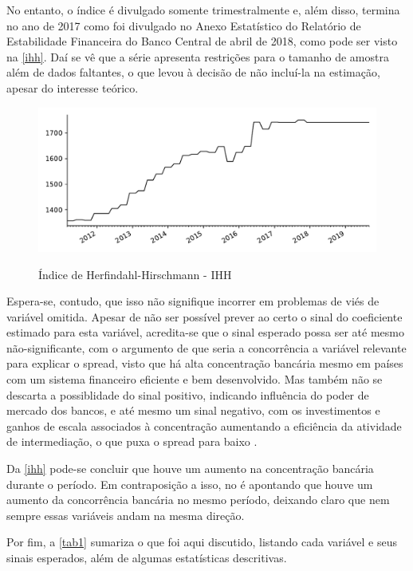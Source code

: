 \documentclass[a4paper,
               article,
               12pt,
               openany,
               oneside,
               english,
               brazil]{abntex2}
\numberwithin{equation}{section}
\begin{document}
    No entanto, o índice é divulgado somente trimestralmente e, além disso, termina no ano de 2017 como foi divulgado no Anexo Estatístico do Relatório de Estabilidade Financeira do Banco Central de abril de 2018, como pode ser visto na \autoref{ihh}. Daí se vê que a série apresenta restrições para o tamanho de amostra além de dados faltantes, o que levou à decisão de não incluí-la na estimação, apesar do interesse teórico.

    \begin{figure}[h]
        \centering
        \caption{Índice de Herfindahl-Hirschmann - IHH}
        \includegraphics[width = \textwidth, scale=0.75]{ihh.pdf}
        \label{ihh}
    \end{figure}

    Espera-se, contudo, que isso não signifique incorrer em problemas de viés de variável omitida. Apesar de não ser possível prever ao certo o sinal do coeficiente estimado para esta variável, acredita-se que o sinal esperado possa ser até mesmo não-significante, com o argumento de que seria a concorrência a variável relevante para explicar o spread, visto que há alta concentração bancária mesmo em países com um sistema financeiro eficiente e bem desenvolvido. Mas também não se descarta a possiblidade do sinal positivo, indicando influência do poder de mercado dos bancos, e até mesmo um sinal negativo, com os investimentos e ganhos de escala associados à concentração aumentando a eficiência da atividade de intermediação, o que puxa o spread para baixo \cite{reb2017}. 

    Da \autoref{ihh} pode-se concluir que houve um aumento na concentração bancária durante o período. Em contraposição a isso, no \textcite[11]{reb2017} é apontando que houve um aumento da concorrência bancária no mesmo período, deixando claro que nem sempre essas variáveis andam na mesma direção.

    Por fim, a \autoref{tab1} sumariza o que foi aqui discutido, listando cada variável e seus sinais esperados, além de algumas estatísticas descritivas.
\end{document}

